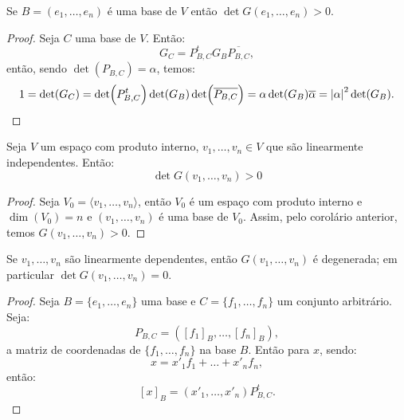 \documentclass[11pt,twoside,a4paper]{book}
\begin{document}
\begin{corolario}
Se $B=(e_1,\dots,e_n)$ é uma base de $V$ então $\det G(e_1,\dots,e_n)>0$.
\end{corolario}
\begin{proof}
Seja $C$ uma base de $V$. Então:
\[
G_C=P^t_{B,C}G_B\overline{P_{B,C}},
\]
então, sendo $\det(P_{B,C})=\alpha$, temos:
\[
1=\det(G_C)=\det(P^t_{B,C})\det(G_B)\det(\overline{P_{B,C}})=\alpha\det(G_B)\overline{\alpha}=\abs{\alpha}^2\det(G_B).
\]
\end{proof}

\begin{corolario}
Seja $V$ um espaço com produto interno, $v_1,\dots,v_n\in V$ que são linearmente independentes. Então:
\[
\det G(v_1,\dots,v_n)>0
\]
\end{corolario}
\begin{proof}
Seja $V_0=\langle v_1,\dots,v_n\rangle$, então $V_0$ é um espaço com produto interno e $\dim(V_0)=n$ e $(v_1,\dots,v_n)$ é uma base de $V_0$. Assim, pelo corolário anterior, temos $G(v_1,\dots,v_n)>0$.
\end{proof}

\begin{proposicao}
Se $v_1,\dots,v_n$ são linearmente dependentes, então $G(v_1,\dots,v_n)$ é degenerada; em particular $\det G(v_1,\dots,v_n)=0$.
\end{proposicao}
\begin{proof}
Seja $B=\{e_1,\dots,e_n\}$ uma base e $C=\{f_1,\dots,f_n\}$ um conjunto arbitrário. Seja:
\[
P_{B,C}=\left([f_1]_B,\dots,[f_n]_B\right),
\]
a matriz de coordenadas de $\{f_1,\dots,f_n\}$ na base $B$. Então para $x$, sendo:
\[
x=x'_1f_1+\dots+x'_nf_n,
\]
então:
\[
[x]_B=\left(x'_1,\dots,x'_n\right)P^t_{B,C}.
\]
\end{proof}
\end{document}
